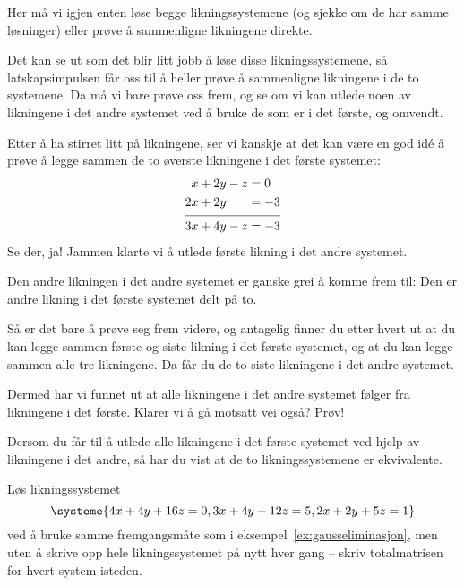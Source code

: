 \begin{losning}
Her må vi igjen enten løse begge likningssystemene (og sjekke om de
har samme løsninger) eller prøve å sammenligne likningene direkte.

Det kan se ut som det blir litt jobb å løse disse likningssystemene,
så latskapsimpulsen får oss til å heller prøve å sammenligne
likningene i de to systemene.  Da må vi bare prøve oss frem, og se om
vi kan utlede noen av likningene i det andre systemet ved å bruke de
som er i det første, og omvendt.

Etter å ha stirret litt på likningene, ser vi kanskje at det kan være
en god idé å prøve å legge sammen de to øverste likningene i det
første systemet:
\[
\begin{aligned}
\phantom{2}x + 2y - z &= 0 \\
2x + 2y \phantom{\hbox{}-z} &= -3 \\[4pt] \hline
\rule{0pt}{11pt}
3x + 4y - z &= -3
\end{aligned}
\]
Se der, ja!  Jammen klarte vi å utlede første likning i det andre
systemet.

Den andre likningen i det andre systemet er ganske grei å komme frem
til: Den er andre likning i det første systemet delt på to.

Så er det bare å prøve seg frem videre, og antagelig finner du etter
hvert ut at du kan legge sammen første og siste likning i det første
systemet, og at du kan legge sammen alle tre likningene.  Da får du de
to siste likningene i det andre systemet.

Dermed har vi funnet ut at alle likningene i det andre systemet følger
fra likningene i det første.  Klarer vi å gå motsatt vei også?  Prøv!

Dersom du får til å utlede alle likningene i det første systemet ved
hjelp av likningene i det andre, så har du vist at de to
likningssystemene er ekvivalente.
\end{losning}


\begin{oppgave}
Løs likningssystemet
\[
\systeme{
  4x + 4y + 16z = 0,
  3x + 4y + 12z = 5,
  2x + 2y + 5z = 1
}
\]
ved å bruke samme fremgangsmåte som i eksempel~\ref{ex:gausseliminasjon},
men uten å skrive opp hele likningssystemet på nytt hver gang --
skriv totalmatrisen for hvert system isteden.
\end{oppgave}

